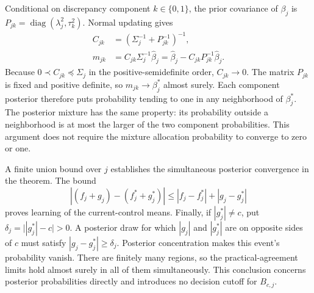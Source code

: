 \documentclass[11pt]{article}
\theoremstyle{remark}\newtheorem{remark}{Remark}[section]
\begin{document}
Conditional on discrepancy component $k\in\{0,1\}$, the prior covariance of $\beta_j$ is $P_{jk}=\operatorname{diag}(\lambda_j^2,\tau_k^2)$. Normal updating gives
\begin{equation}\label{eq:regional_posterior}
\begin{aligned}
C_{jk}&=(\Sigma_j^{-1}+P_{jk}^{-1})^{-1},\\
m_{jk}&=C_{jk}\Sigma_j^{-1}\widehat\beta_j
=\widehat\beta_j-C_{jk}P_{jk}^{-1}\widehat\beta_j.
\end{aligned}
\end{equation}
Because $0\prec C_{jk}\preceq\Sigma_j$ in the positive-semidefinite order, $C_{jk}\to0$. The matrix $P_{jk}$ is fixed and positive definite, so $m_{jk}\to\beta_j^*$ almost surely. Each component posterior therefore puts probability tending to one in any neighborhood of $\beta_j^*$. The posterior mixture has the same property: its probability outside a neighborhood is at most the larger of the two component probabilities. This argument does not require the mixture allocation probability to converge to zero or one.

A finite union bound over $j$ establishes the simultaneous posterior convergence in the theorem. The bound
\[
|(f_j+g_j)-(f_j^*+g_j^*)|\leq|f_j-f_j^*|+|g_j-g_j^*|
\]
proves learning of the current-control means. Finally, if $|g_j^*|\ne c$, put $\delta_j=\bigl||g_j^*|-c\bigr|>0$. A posterior draw for which $|g_j|$ and $|g_j^*|$ are on opposite sides of $c$ must satisfy $|g_j-g_j^*|\geq\delta_j$. Posterior concentration makes this event's probability vanish. There are finitely many regions, so the practical-agreement limits hold almost surely in all of them simultaneously. This conclusion concerns posterior probabilities directly and introduces no decision cutoff for $B_{c,j}$.
\end{document}
